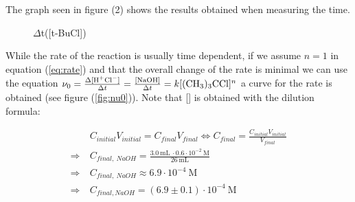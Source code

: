 \documentclass[12pt]{article}
\begin{document}
\noindent The graph seen in figure (2) shows the results obtained when measuring the time.

\begin{figure}[!ht]
    \centering
    \caption{$\Delta$t([t-BuCl])}
    \label{fig:dt}
\end{figure}
\FloatBarrier

\noindent While the rate of the reaction is usually time dependent, if we assume $n=1$ in equation (\ref{eq:rate}) and that the overall change of the rate is minimal we can use the equation $\nu_0 = \frac{\Delta [\ce{H+Cl-}]}{\Delta t} = \frac{[\ce{NaOH}]}{\Delta t} =k[\ce{(CH3)3CCl}]^n$ a curve for the rate is obtained (see figure (\ref{fig:nu0})). Note that [] is obtained with the dilution formula: 

\begin{align} 
    &C_{initial}V_{initial}=C_{final}V_{final} \Leftrightarrow C_{final} = \frac{C_{initial}V_{initial}}{V_{final}} \nonumber \\ 
    \Rightarrow \ &C_{final,\ NaOH} = \frac{3.0 \ \text{mL} \ \cdot 0.6 \cdot 10^{-2} \ \text{M}}{26 \ \text{mL}} \nonumber \\
    \Rightarrow \ &C_{final,\ NaOH} \approx 6.9 \cdot 10^{-4} \ \text{M} \nonumber \\
    \Rightarrow \  &\boxed{C_{final, NaOH} = (6.9 \pm 0.1) \cdot 10^{-4} \ \text{M}} \nonumber
\end{align}
\end{document}
